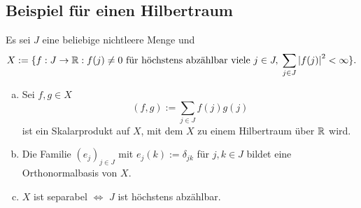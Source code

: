 \documentclass[FunkAnaSkript.tex]{subfiles}
\begin{document}
\subsection{ Beispiel für einen Hilbertraum}
\label{B5.1}
Es sei $J$ eine beliebige nichtleere Menge und
	$$X:=\{ f: J \to \mathbb{R} : f(j) \not = 0 \text{ für höchstens abzählbar viele } j\in J,\; \sum_{j\in J} \left\lvert f(j) \right\rvert ^2 < \infty\}.$$
	\begin{beh}
	
	\begin{enumerate}[(a)]
	\item Sei $f,g \in X$
		$$(f,g) := \sum_{j\in J} f(j)g(j) $$
		ist ein Skalarprodukt auf $X$, mit dem $X$ zu einem Hilbertraum über $\mathbb{R}$ wird.
	
	\item Die Familie $(e_j)_{j\in J}$ mit $e_j(k) := \delta_{jk} $ für $j,k\in J$ bildet eine Orthonormalbasis von $X$.
	
	\item $X$ ist separabel $\Leftrightarrow$ $J$ ist höchstens abzählbar.	
	\end{enumerate}
	\end{beh}
\end{document}
